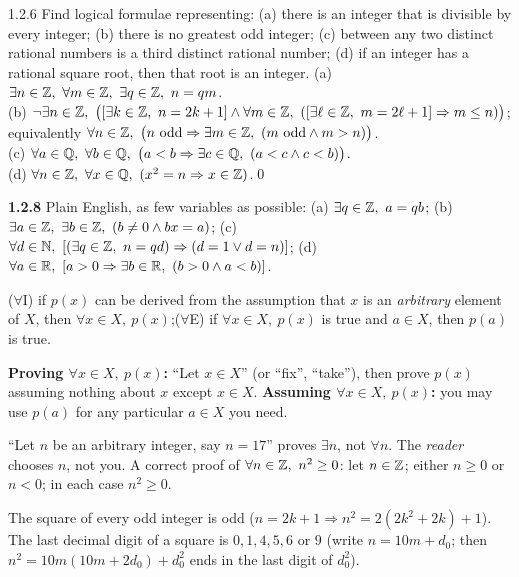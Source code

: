 \begin{bookex}[essential]{1.2.6}
Find logical formulae representing: (a) there is an integer that is divisible by every integer; (b) there is no greatest odd integer; (c) between any two distinct rational numbers is a third distinct rational number; (d) if an integer has a rational square root, then that root is an integer.
\solution
(a) $\exists n\in\mathbb{Z},\ \forall m\in\mathbb{Z},\ \exists q\in\mathbb{Z},\ n=qm$. \\
(b) $\neg\exists n\in\Z,\ \big([\exists k\in\Z,\ n=2k+1]\wedge\forall m\in\Z,\ ([\exists\ell\in\Z,\ m=2\ell+1]\Rightarrow m\le n)\big)$; equivalently $\forall n\in\mathbb{Z},\ \big(n\text{ odd}\Rightarrow\exists m\in\mathbb{Z},\ (m\text{ odd}\wedge m>n)\big)$.\\
(c) $\forall a\in\Q,\ \forall b\in\Q,\ \big(a<b\Rightarrow\exists c\in\Q,\ (a<c\wedge c<b)\big)$.\\
(d) $\forall n\in\Z,\ \forall x\in\Q,\ (x^2=n\Rightarrow x\in\Z)$.\qed
\end{bookex}

\begin{trybox}[{1.2.8 \fO}]
\textbf{1.2.8} Plain English, as few variables as possible: (a) $\exists q\in\mathbb{Z},\ a=qb$; (b) $\exists a\in\mathbb{Z},\ \exists b\in\mathbb{Z},\ (b\ne0\wedge bx=a)$; (c) $\forall d\in\mathbb{N},\ [(\exists q\in\mathbb{Z},\ n=qd)\Rightarrow(d=1\vee d=n)]$; (d) $\forall a\in\R,\ [a>0\Rightarrow\exists b\in\R,\ (b>0\wedge a<b)]$.
\end{trybox}

\begin{key}
($\forall$I) if $p(x)$ can be derived from the assumption that $x$ is an \emph{arbitrary} element of $X$, then $\forall x\in X,\ p(x)$;\quad ($\forall$E) if $\forall x\in X,\ p(x)$ is true and $a\in X$, then $p(a)$ is true.
\end{key}
\begin{strategy}
\textbf{Proving $\forall x\in X,\ p(x)$:} ``Let $x\in X$'' (or ``fix'', ``take''), then prove $p(x)$ assuming nothing about $x$ except $x\in X$. \textbf{Assuming $\forall x\in X,\ p(x)$:} you may use $p(a)$ for any particular $a\in X$ you need.
\end{strategy}
\begin{warn}
``Let $n$ be an arbitrary integer, say $n=17$'' proves $\exists n$, not $\forall n$. The \emph{reader} chooses $n$, not you. A correct proof of $\forall n\in\Z,\ n^2\ge0$: let $n\in\mathbb{Z}$; either $n\ge0$ or $n<0$; in each case $n^2\ge0$.
\end{warn}
\begin{result}
The square of every odd integer is odd ($n=2k+1\Rightarrow n^2=2(2k^2+2k)+1$). The last decimal digit of a square is $0,1,4,5,6$ or $9$ (write $n=10m+d_0$; then $n^2=10m(10m+2d_0)+d_0^2$ ends in the last digit of $d_0^2$).
\end{result}

